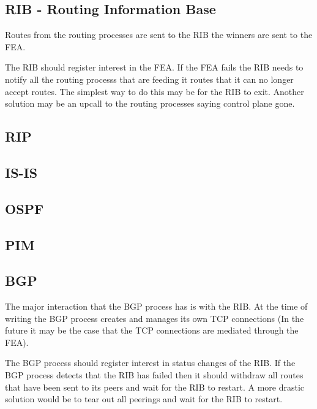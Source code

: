 \documentclass[11pt]{article}
\begin{document}
\subsection{RIB - Routing Information Base}
Routes from the routing processes are sent to the RIB the winners are
sent to the FEA.

The RIB should register interest in the FEA. If the FEA fails the RIB
needs to notify all the routing processs that are feeding it routes
that it can no longer accept routes. The simplest way to do this may
be for the RIB to exit. Another solution may be an upcall to the
routing processes saying control plane gone.


\subsection{RIP}

\subsection{IS-IS}

\subsection{OSPF}

\subsection{PIM}

\subsection{BGP}
The major interaction that the BGP process has is with the RIB. At the
time of writing the BGP process creates and manages its own TCP
connections (In the future it may be the case that the TCP connections
are mediated through the FEA). 

The BGP process should register interest in status changes of the RIB.
If the BGP process detects that the RIB has failed then it should
withdraw all routes that have been sent to its peers and wait for the
RIB to restart. A more drastic solution would be to tear out all
peerings and wait for the RIB to restart.



\end{document}
